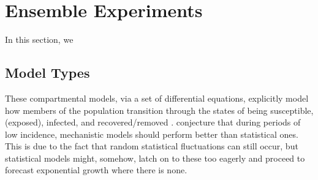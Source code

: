 \section{Ensemble Experiments}
In this section, we 
\subsection{Model Types}
These compartmental models, via a set of differential equations, explicitly model how members of the population transition through the states of being susceptible, (exposed), infected, and recovered/removed \cite{taylor_combining_2021}.
\cite{taylor_combining_2021} conjecture that during periods of low incidence, mechanistic models should perform better than statistical ones. This is due to the fact that random statistical fluctuations can still occur, but statistical models might, somehow, latch on to these too eagerly and proceed to forecast exponential growth where there is none.
